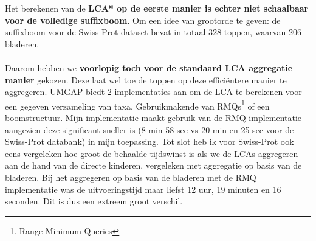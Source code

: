 Het berekenen van de \textbf{LCA* op de eerste manier is echter niet schaalbaar voor de volledige suffixboom}.
Om een idee van grootorde te geven: de suffixboom voor de Swiss-Prot dataset bevat in totaal 328 toppen, waarvan 206 bladeren.
\\ \\
Daarom hebben we \textbf{voorlopig toch voor de standaard LCA aggregatie manier} gekozen.
Deze laat wel toe de toppen op deze efficiëntere manier te aggregeren.
UMGAP biedt 2 implementaties aan om de LCA te berekenen voor een gegeven verzameling van taxa.
Gebruikmakende van RMQs\footnote{Range Minimum Queries} of een boomstructuur.
Mijn implementatie maakt gebruik van de RMQ implementatie aangezien deze significant sneller is (8 min 58 sec vs 20 min en 25 sec voor de Swiss-Prot databank) in mijn toepassing.
Tot slot heb ik voor Swiss-Prot ook eens vergeleken hoe groot de behaalde tijdswinst is als we de LCAs aggregeren aan de hand van de directe kinderen, vergeleken met aggregatie op basis van de bladeren.
Bij het aggregeren op basis van de bladeren met de RMQ implementatie was de uitvoeringstijd maar liefst 12 uur, 19 minuten en 16 seconden.
Dit is dus een extreem groot verschil.

